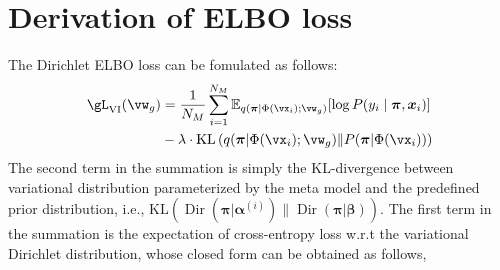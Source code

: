 \section{Derivation of ELBO loss} \label{sec:ELBO-appendix}
The Dirichlet ELBO loss can be fomulated as follows:
\begin{align}
\gL_{\mathrm{VI}}(\vw_g) &=\frac{1}{N_M}\sum_{i=1}^{N_M} \mathbb{E}_{q(\boldsymbol{\pi}| \Phi(\vx_i); \vw_g)}[\log P(y_i \mid \boldsymbol{\pi}, \boldsymbol{x}_i)] \nonumber \\
&- \lambda\cdot\mathrm{KL}\left(q(\boldsymbol{\pi}| \Phi(\vx_i); \vw_g) \| P(\boldsymbol{\pi} | \Phi(\vx_i))\right)
\end{align}
\normalsize
The second term in the summation is simply the KL-divergence between variational distribution parameterized by the meta model and the predefined prior distribution, i.e., $\mathrm{KL}\left( \operatorname{Dir}(\boldsymbol{\pi}| \boldsymbol{\alpha}^{(i)}) \| \operatorname{Dir}(\boldsymbol{\pi} | \boldsymbol{\beta})\right)$. The first term in the summation is the expectation of cross-entropy loss w.r.t the variational Dirichlet distribution, whose closed form can be obtained as follows,
